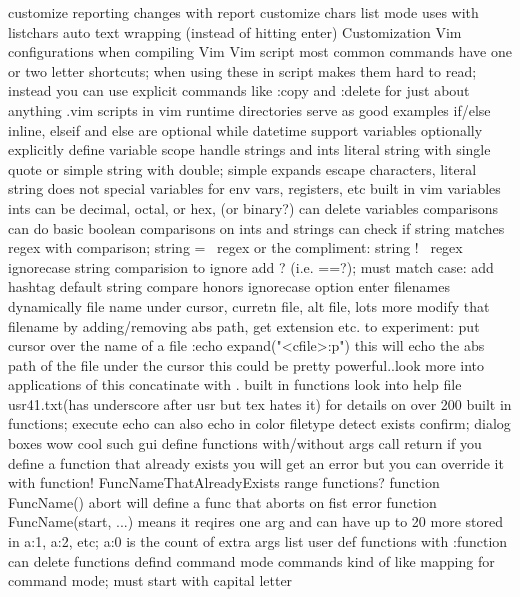 \documentclass[12pt]{book}
\begin{document}
{{    customize reporting changes with report
  customize chars list mode uses with listchars
  auto text wrapping (instead of hitting enter)
Customization
  Vim configurations when compiling Vim
  Vim script
    most common commands have one or two letter shortcuts; when using these in script makes them hard to read; instead you can use explicit commands like :copy and :delete for just about anything
    .vim scripts in vim runtime directories serve as good examples
    if/else
      inline, elseif and else are optional
    while
    datetime support
    variables
      optionally explicitly define variable scope
      handle strings and ints
      literal string with single quote or simple string with double; simple expands escape characters, literal string does not
      special variables for env vars, registers, etc
      built in vim variables
      ints can be decimal, octal, or hex, (or binary?)
      can delete variables
    comparisons
      can do basic boolean comparisons on ints and strings
      can check if string matches regex with comparison; string =~ regex or the compliment: string !~ regex
      ignorecase string comparision
        to ignore add ? (i.e. ==?); must match case: add hashtag
        default string compare honors ignorecase option
    enter filenames dynamically
      file name under cursor, curretn file, alt file, lots more
      modify that filename by adding/removing abs path, get extension etc.
      to experiment:
        put cursor over the name of a file
        :echo expand("<cfile>:p")
        this will echo the abs path of the file under the cursor
        this could be pretty powerful..look more into applications of this
    concatinate with .
    built in functions
      look into help file usr41.txt(has underscore after usr but tex hates it) for details on over 200 built in functions;
      execute
      echo
        can also echo in color
      filetype detect
      exists
      confirm; dialog boxes wow cool such gui
    define functions
      with/without args
      call
      return
      if you define a function that already exists you will get an error but you can override it with function! FuncNameThatAlreadyExists
      range functions?
      function FuncName() abort will define a func that aborts on fist error
      function FuncName(start, ...) means it reqires one arg and can have up to 20 more stored in a:1, a:2, etc; a:0 is the count of extra args
      list user def functions with :function
      can delete functions
    defind command mode commands
      kind of like mapping for command mode; must start with capital letter
}}
\end{document}
